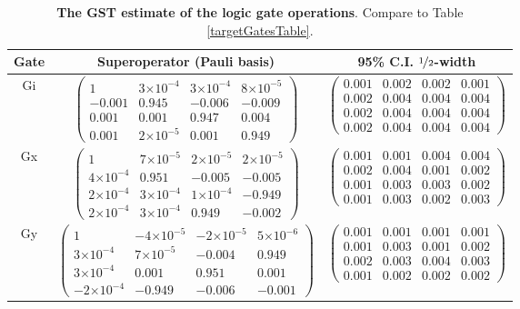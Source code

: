 \documentclass{article}[11pt]
\providecommand{\e}[1]{\ensuremath{\times 10^{#1}}}
\begin{document}
\begin{table}[h]
\begin{center}
\begin{tabular}[l]{|c|c|c|}
\hline
Gate & Superoperator (Pauli basis) & 95\% C.I. $\nicefrac{1}{2}$-width \\ \hline
Gi & $ \left(\!\!\begin{array}{cccc}
1 & 3\e{-4} & 3\e{-4} & 8\e{-5} \\ 
-0.001 & 0.945 & -0.006 & -0.009 \\ 
0.001 & 0.001 & 0.947 & 0.004 \\ 
0.001 & 2\e{-5} & 0.001 & 0.949
 \end{array}\!\!\right) $
 & $ \left(\!\!\begin{array}{cccc}
0.001 & 0.002 & 0.002 & 0.001 \\ 
0.002 & 0.004 & 0.004 & 0.004 \\ 
0.002 & 0.004 & 0.004 & 0.004 \\ 
0.002 & 0.004 & 0.004 & 0.004
 \end{array}\!\!\right) $
 \\ \hline
Gx & $ \left(\!\!\begin{array}{cccc}
1 & 7\e{-5} & 2\e{-5} & 2\e{-5} \\ 
4\e{-4} & 0.951 & -0.005 & -0.005 \\ 
2\e{-4} & 3\e{-4} & 1\e{-4} & -0.949 \\ 
2\e{-4} & 3\e{-4} & 0.949 & -0.002
 \end{array}\!\!\right) $
 & $ \left(\!\!\begin{array}{cccc}
0.001 & 0.001 & 0.004 & 0.004 \\ 
0.002 & 0.004 & 0.001 & 0.002 \\ 
0.001 & 0.003 & 0.003 & 0.002 \\ 
0.001 & 0.003 & 0.002 & 0.003
 \end{array}\!\!\right) $
 \\ \hline
Gy & $ \left(\!\!\begin{array}{cccc}
1 & -4\e{-5} & -2\e{-5} & 5\e{-6} \\ 
3\e{-4} & 7\e{-5} & -0.004 & 0.949 \\ 
3\e{-4} & 0.001 & 0.951 & 0.001 \\ 
-2\e{-4} & -0.949 & -0.006 & -0.001
 \end{array}\!\!\right) $
 & $ \left(\!\!\begin{array}{cccc}
0.001 & 0.001 & 0.001 & 0.001 \\ 
0.001 & 0.003 & 0.001 & 0.002 \\ 
0.002 & 0.003 & 0.004 & 0.003 \\ 
0.001 & 0.002 & 0.002 & 0.002
 \end{array}\!\!\right) $
 \\ \hline
\end{tabular}

\caption{\textbf{The GST estimate of the logic gate operations}.  Compare to Table \ref{targetGatesTable}.\label{bestGatesetGatesTable}}
\end{center}
\end{table}
\end{document}
